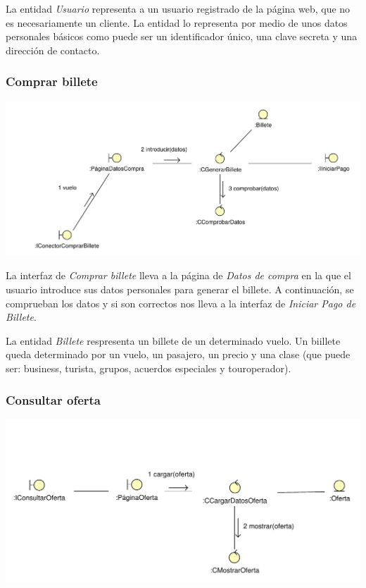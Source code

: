 \documentclass[11pt, a4paper, twoside, titlepage]{article}
\begin{document}
				La entidad {\itshape Usuario} representa a un usuario registrado de la página web, que no es necesariamente un cliente. La entidad lo representa por medio de unos datos personales básicos como puede ser un identificador único, una clave secreta y una dirección de contacto.


			\subsubsection{Comprar billete}
				\begin{center}
					\includegraphics[scale=.72]{analisis/diagramas/comprarbillete.pdf}
				\end{center}
					
					La interfaz  de {\itshape Comprar billete} lleva a la página de {\itshape Datos de compra} en la que el usuario introduce sus datos personales para generar el billete. A continuación, se comprueban los datos y si son correctos nos lleva a la interfaz de {\itshape Iniciar Pago de Billete}.

					La entidad {\itshape Billete} respresenta un billete de un determinado vuelo. Un biillete queda determinado por un vuelo, un pasajero, un precio y una clase (que puede ser:  business, turista, grupos, acuerdos especiales y touroperador).


			\subsubsection{Consultar oferta}
				\begin{center}
					\includegraphics[scale=.75]{analisis/diagramas/consultaroferta.pdf}
				\end{center}
					
\end{document}
